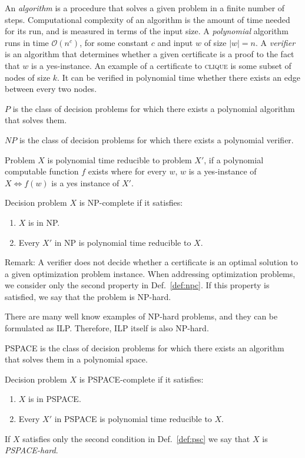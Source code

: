 An \emph{algorithm} is a procedure that solves a given problem in a finite number of steps.
Computational complexity of an algorithm is the amount of time needed for its run, and is measured in terms of the input size.
A \emph{polynomial} algorithm runs in time $\mathcal{O}(n^c)$, for some constant $c$ and input $w$ of size $|w|=n$.
A \emph{verifier} is an algorithm that determines whether a given certificate is a proof to the fact that $w$ is a yes-instance.
An example of a certificate to \textsc{clique} is some subset of nodes of size $k$.
It can be verified in polynomial time whether there exists an edge between every two nodes.
\begin{definition}
	$P$ is the class of decision problems for which there exists a polynomial algorithm that solves them.
\end{definition}
\begin{definition}
	$NP$ is the class of decision problems for which there exists a polynomial verifier. 
\end{definition}
\begin{definition}
	Problem $X$ is polynomial time reducible to problem $X'$, if a polynomial computable function $f$ exists where for every $w$, 
	$w$ is a yes-instance of $X\Leftrightarrow f(w)$ is a yes instance of $X'$.
\end{definition}
\begin{definition}\label{def:npc}
	Decision problem $X$ is NP-complete if it satisfies:
	\begin{enumerate}
		\item $X$ is in NP.
		\item Every $X'$ in NP is polynomial time reducible to $X$.
	\end{enumerate}
\end{definition}
Remark:
A verifier does not decide whether a certificate is an optimal solution to a given optimization problem instance. 
When addressing optimization problems, we consider only the second property in Def.~\ref{def:npc}. 
If this property is satisfied, we say that the problem is NP-hard.

There are many well know examples of NP-hard problems, and they can be formulated as ILP.
Therefore, ILP itself is also NP-hard.

\begin{definition}
	PSPACE is the class of decision problems for which there exists an algorithm that solves them in a polynomial space.
\end{definition}
\begin{definition}\label{def:psc}
	Decision problem $X$ is PSPACE-complete if it satisfies:
	\begin{enumerate}
		\item $X$ is in PSPACE.
		\item Every $X'$ in PSPACE is polynomial time reducible to $X$.
	\end{enumerate}
\end{definition}
If $X$ satisfies only the second condition in Def.~\ref{def:psc} we say that $X$ is \emph{PSPACE-hard}.

